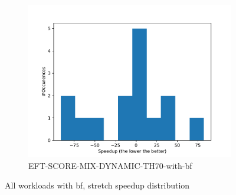 \documentclass[a4paper]{article}
\begin{document}
\begin{figure}[H]
\begin{subfigure}[b]{0.4\linewidth}\centering\includegraphics[width=1\linewidth]{MBSS/plot/Distribution/Stretch/Stretch_all_workloads_bf_EFT-SCORE-MIX-DYNAMIC-TH70-BF.pdf}\caption{EFT-SCORE-MIX-DYNAMIC-TH70-with-bf}\end{subfigure}
\caption{All workloads with bf, stretch speedup distribution}\end{figure}
\end{document}
